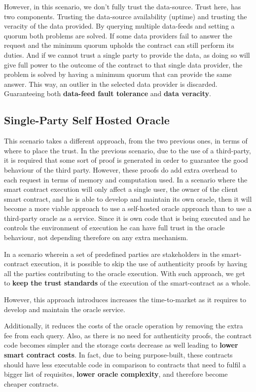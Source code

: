 However, in this scenario, we don't fully trust the data-source. Trust here, has two components. Trusting the data-source availability (uptime) and trusting the veracity of the data provided. By querying multiple data-feeds and setting a quorum both problems are solved. If some data providers fail to answer the request and the minimum quorum upholds the contract can still perform its duties. And if we cannot trust a single party to provide the data, as doing so will give full power to the outcome of the contract to that single data provider, the problem is solved by having a minimum quorum that can provide the same answer. This way, an outlier in the selected data provider is discarded. Guaranteeing both \textbf{data-feed fault tolerance} and \textbf{data veracity}.

\subsection{Single-Party Self Hosted Oracle}\label{SP-SHO}
This scenario takes a different approach, from the two previous ones, in terms of where to place the trust. In the previous scenario, due to the use of a third-party, it is required that some sort of proof is generated in order to guarantee the good behaviour of the third party. However, these proofs do add extra overhead to each request in terms of memory and computation used. In a scenario where the smart contract execution will only affect a single user, the owner of the client smart contract, and he is able to develop and maintain its own oracle, then it will become a more viable approach to use a self-hosted oracle approach than to use a third-party oracle as a service. Since it is own code that is being executed and he controls the environment of execution he can have full trust in the oracle behaviour, not depending therefore on any extra mechanism.


In a scenario wherein a set of predefined parties are stakeholders in the smart-contract execution, it is possible to skip the use of authenticity proofs by having all the parties contributing to the oracle execution. With such approach, we get to \textbf{keep the trust standards} of the execution of the smart-contract as a whole.

However, this approach introduces increases the time-to-market as it requires to develop and maintain the oracle service.

Additionally, it reduces the costs of the oracle operation by removing the extra fee from each query. Also, as there is no need for authenticity proofs, the contract code becomes simpler and the storage costs decrease as well leading to \textbf{lower smart contract costs}. In fact, due to being purpose-built, these contracts should have less executable code in comparison to contracts that need to fulfil a bigger list of requisites, \textbf{lower oracle complexity}, and therefore become cheaper contracts.

